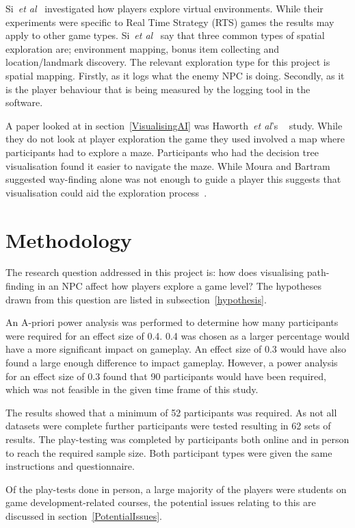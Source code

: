 \documentclass[journal]{IEEEtran}
\begin{document}
	Si~\textit{et al}~\cite{si2017} investigated how players explore virtual environments. While their experiments were specific to Real Time Strategy (RTS) games the results may apply to other game types. Si~\textit{et al}~\cite{si2017} say that three common types of spatial exploration are; environment mapping, bonus item collecting and location/landmark discovery. The relevant exploration type for this project is spatial mapping. Firstly, as it logs what the enemy NPC is doing.  Secondly, as it is the player behaviour that is being measured by the logging tool in the software.
	
	A paper looked at in section~\ref{VisualisingAI} was Haworth~\textit{et al}'s ~\cite{Haworth2010} study. While they do not look at player exploration the game they used involved a map where participants had to explore a maze. Participants who had the decision tree visualisation found it easier to navigate the maze. While Moura and Bartram~\cite{moura2014} suggested way-finding alone was not enough to guide a player this suggests that visualisation could aid the exploration process~\cite{Haworth2010}.
	
	\section{Methodology} \label{methodology}
	The research question addressed in this project is: how does visualising path-finding in an NPC affect how players explore a game level? The hypotheses drawn from this question are listed in subsection~\ref{hypothesis}.  
	
	An A-priori power analysis was performed to determine how many participants were required for an effect size of 0.4. 0.4 was chosen as a larger percentage would have a more significant impact on gameplay.  An effect size of 0.3 would have also found a large enough difference to impact gameplay. However, a power analysis for an effect size of 0.3 found that 90 participants would have been required, which was not feasible in the given time frame of this study.
	
	The results showed that a minimum of 52 participants was required. As not all datasets were complete further participants were tested resulting in 62 sets of results. The play-testing was completed by participants both online and in person to reach the required sample size. Both participant types were given the same instructions and questionnaire. 
	
	Of the play-tests done in person, a large majority of the players were students on game development-related courses, the potential issues relating to this are discussed in section~\ref{PotentialIssues}. 
	
\end{document}
